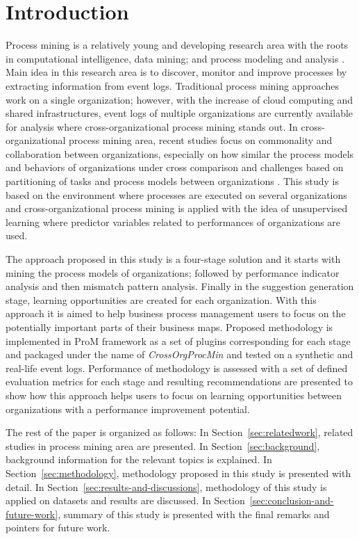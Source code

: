 \section{Introduction}
\label{sec:introduction}

Process mining is a relatively young and developing research area with the roots in computational intelligence, data mining; and process modeling and analysis \cite{van2012process}. Main idea in this research area is to discover, monitor and improve processes by extracting information from event logs. Traditional process mining approaches work on a single organization; however, with the increase of cloud computing and shared infrastructures, event logs of multiple organizations are currently available for analysis where cross-organizational process mining stands out. In cross-organizational process mining area, recent studies focus on commonality and collaboration between organizations, especially on how similar the process models and behaviors of organizations under cross comparison \cite{buijs2012towards} and challenges based on partitioning of tasks and process models between organizations \cite{van2011intra}. This study is based on the environment where processes are executed on several organizations and cross-organizational process mining is applied with the idea of unsupervised learning where predictor variables related to performances of organizations are used.

The approach proposed in this study is a four-stage solution and it starts with mining the process models of organizations; followed by performance indicator analysis and then mismatch pattern analysis. Finally in the suggestion generation stage, learning opportunities are created for each organization. With this approach it is aimed to help business process management users to focus on the potentially important parts of their business maps. Proposed methodology is implemented in ProM framework \cite{verbeek2010prom} as a set of plugins corresponding for each stage and packaged under the name of \textit{CrossOrgProcMin} and tested on a synthetic and real-life event logs. Performance of methodology is assessed with a set of defined evaluation metrics for each stage and resulting recommendations are presented to show how this approach helps users to focus on learning opportunities between organizations with a performance improvement potential.

The rest of the paper is organized as follows: In Section~\ref{sec:relatedwork}, related studies in process mining area are presented. In Section~\ref{sec:background}, background information for the relevant topics is explained. In Section~\ref{sec:methodology}, methodology proposed in this study is presented with detail. In Section~\ref{sec:results-and-discussions}, methodology of this study is applied on datasets and results are discussed. In Section~\ref{sec:conclusion-and-future-work}, summary of this study is presented with the final remarks and pointers for future work. 